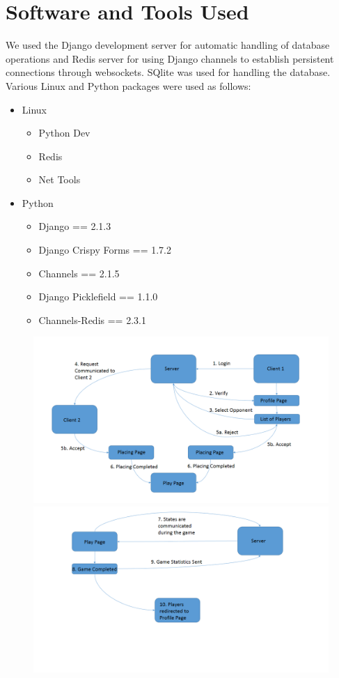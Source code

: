 \documentclass[titlepage]{article}
\begin{document}
\section{Software and Tools Used}
We used the Django development server for automatic handling of database operations and Redis server for using Django channels to establish persistent connections through websockets. SQlite was used for handling the database. Various Linux and Python packages were used as follows:
\begin{itemize}
    \item Linux
    \begin{itemize}
        \item Python Dev
        \item Redis
        \item Net Tools
    \end{itemize}
    \item Python
    \begin{itemize}
        \item Django == 2.1.3
        \item Django Crispy Forms == 1.7.2
        \item Channels == 2.1.5
        \item Django Picklefield == 1.1.0
        \item Channels-Redis == 2.3.1
    \end{itemize}
\end{itemize}

\begin{center}
\begin{figure}[h]
    \includegraphics[scale=0.35]{Slide3.PNG}\\
    \includegraphics[scale=0.35]{Slide4.PNG}
\end{figure}
\end{center}
\end{document}
